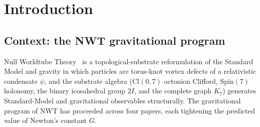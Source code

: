 \documentclass[11pt]{article}
\begin{document}
\begin{abstract}
We discuss known open problems:\ the cosmological-constant
fine-tuning ($\sim 10^{120}$ gap, of which the $K_7$-amplitude
factor closes $\sim 45$ orders, leaving $\sim 75$ unresolved and
deferred to Paper~21~\cite{paper19}); the formation of black holes
from dynamical collapse of NWT vortex configurations;\ ghost-freedom
of the Stelle higher-curvature sector beyond linear order;\ and a
quantum-level treatment of diffeomorphism invariance on curved
backgrounds.  None of these are NWT-specific; all are flagged as
candidate research programs for follow-up papers.

The result strengthens the framework of Papers~14--17: the
gravitational coupling that emerges from the NWT condensate at the
classical level is verified at the quantum-loop level (Sakharov),
at the structural level ($K_7$ amplitude), and now at the
dynamical level (Einstein equations on arbitrary backgrounds).
The non-linearity of gravity is geometric, following from
variation of the Sakharov-induced Einstein--Hilbert action, not
from additional matter physics.
\end{abstract}

\tableofcontents

\section{Introduction}
\label{sec:intro}

\subsection{Context: the NWT gravitational program}

Null Worldtube Theory~\cite{paper14, paper15, paper16, paper17}
is a topological-substrate reformulation of the Standard Model and
gravity in which particles are torus-knot vortex defects of a
relativistic condensate $\psi$, and the substrate algebra
($\mathrm{Cl}(0,7)$ octonion Clifford,
$\mathrm{Spin}(7)$ holonomy, the binary icosahedral group $2I$, and
the complete graph $K_7$) generates Standard-Model and gravitational
observables structurally.  The gravitational program of NWT has
proceeded across four papers, each tightening the predicted value
of Newton's constant $G$.
\end{document}
